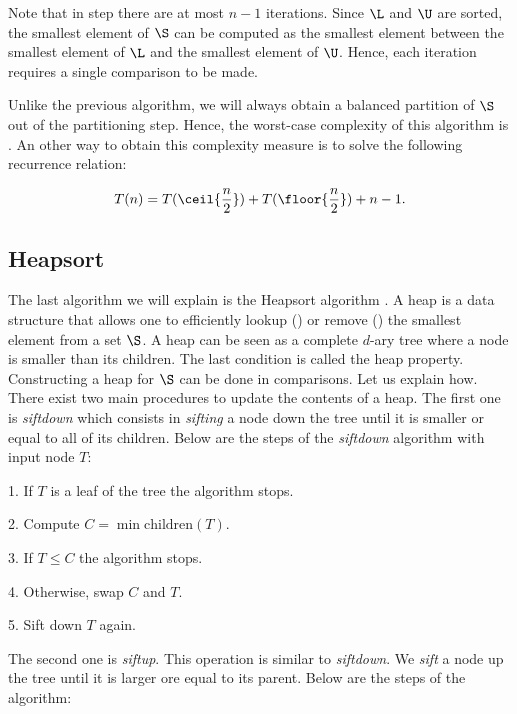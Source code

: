 Note that in step  there are at most \(n - 1\) iterations. Since \(\L\)
and \(\U\) are sorted, the smallest element of \(\S\) can be computed as the
smallest element between the smallest element of \(\L\) and the smallest
element of \(\U\). Hence, each iteration requires a single comparison to be
made.

Unlike the previous algorithm, we will always obtain a balanced partition of
\(\S\) out of the partitioning step. Hence, the worst-case complexity of this
algorithm is . An other way to obtain this complexity measure
is to solve the following recurrence relation:

\begin{displaymath}
T(n) = T(\ceil{\frac{n}{2}}) + T(\floor{\frac{n}{2}}) + n - 1.
\end{displaymath}

\subsection*{Heapsort}

The last algorithm we will explain is the Heapsort algorithm
\cite{williams:1964}. A heap is a data structure that allows one to
efficiently lookup () or remove () the smallest element
from a set \(\S\). A heap can be seen as a complete \(d\)-ary tree where a node
is smaller than its children. The last condition is called the heap property.
Constructing a heap for \(\S\) can be done in  comparisons.  Let us
explain how. There exist two main procedures to update the contents of a heap.
The first one is \emph{siftdown} which consists in \emph{sifting} a node down
the tree until it is smaller or equal to all of its children. Below are the
steps of the \emph{siftdown} algorithm with input node \(T\):

\begin{algorithm}
\item[1.] If \(T\) is a leaf of the tree the algorithm stops.
\item[2.] Compute \(C = \min \text{children}(T)\).
\item[3.] If \(T \le C\) the algorithm stops.
\item[4.] Otherwise, swap \(C\) and \(T\).
\item[5.] Sift down \(T\) again.
\end{algorithm}

The second one is \emph{siftup}. This operation is similar to \emph{siftdown}.
We \emph{sift} a node up the tree until it is larger ore equal to its parent.
Below are the steps of the algorithm:

